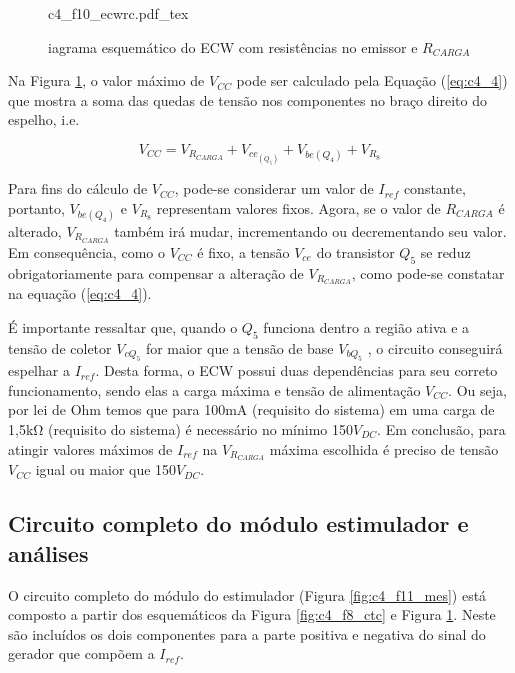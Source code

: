 \begin{figure}[h]
    \centering %
    \small %
    \def\svgwidth{0.7\columnwidth}%
    {c4_f10_ecwrc.pdf_tex}
    \caption{iagrama esquemático do \acrshort{ECW} com resistências no emissor e $R_{CARGA}$ \cite{NacimentoJunqueira2003}}
    \label{fig:c4_f10_ecwrc}
\end{figure}

Na Figura \ref{fig:c4_f10_ecwrc}, o valor máximo de $V_{CC}$ pode ser calculado pela Equação (\ref{eq:c4_4}) que mostra a soma das quedas de tensão nos componentes no braço direito do espelho, i.e.

\begin{equation}
    V_{CC}= V_{R_{CARGA}} + V_{ce_{(Q_5)}} + V_{be{(Q_4)}} + V_{R_8}
    \label{eq:c4_4}
\end{equation}

Para fins do cálculo de $V_{CC}$, pode-se considerar um valor de $I_{ref}$ constante, portanto, $V_{be{(Q_4)}}$  e $V_{R_8}$  representam valores fixos. Agora, se o valor de $R_{CARGA}$ é alterado, $V_{R_{CARGA}}$ também irá mudar, incrementando ou decrementando seu valor. Em consequência, como o $V_{CC}$ é fixo, a tensão $V_{ce}$ do transistor $Q_5$ se reduz obrigatoriamente para compensar a alteração de $V_{R_{CARGA}}$, como pode-se constatar na equação (\ref{eq:c4_4}).

É importante ressaltar que, quando o $Q_5$ funciona dentro a região ativa e a tensão de coletor $V_{c{Q_5}}$ for maior que a tensão de base $V_{b{Q_5}}$ , o circuito conseguirá espelhar a $I_{ref}$. Desta forma, o \acrshort{ECW} possui duas dependências para seu correto funcionamento, sendo elas a carga máxima e tensão de alimentação $V_{CC}$. Ou seja, por lei de Ohm temos que para 100mA (requisito do sistema) em uma carga de 1,5k$\mathrm{\Omega}$ (requisito do sistema) é necessário no mínimo 150$V_{DC}$. Em conclusão, para atingir valores máximos de $I_{ref}$ na $V_{R_{CARGA}}$ máxima escolhida é preciso de tensão $V_{CC}$ igual ou maior que 150$V_{DC}$. 

\subsection*{Circuito completo do módulo estimulador e análises}
O circuito completo do módulo do estimulador (Figura \ref{fig:c4_f11_mes}) está composto a partir dos esquemáticos da Figura \ref{fig:c4_f8_ctc} e Figura \ref{fig:c4_f10_ecwrc}. Neste são incluídos os dois componentes para a parte positiva e negativa do sinal do gerador que compõem a $I_{ref}$.

